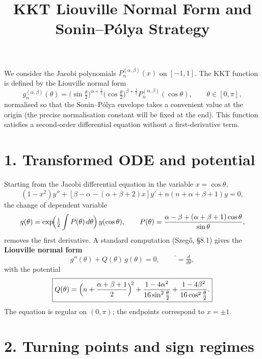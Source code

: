 \documentclass[11pt]{article}
\title{KKT Liouville Normal Form and Sonin--P\'olya Strategy}
\author{}
\date{}
\begin{document}
\maketitle
We consider the Jacobi polynomials \(P_n^{(\alpha,\beta)}(x)\) on \([-1,1]\). The KKT function is defined by the Liouville normal form
\begin{equation*}
g_n^{(\alpha,\beta)}(\theta)=\bigl(\sin\tfrac{\theta}{2}\bigr)^{\alpha+\frac12}
\bigl(\cos\tfrac{\theta}{2}\bigr)^{\beta+\frac12}
P_n^{(\alpha,\beta)}(\cos\theta),\qquad \theta\in[0,\pi],
\end{equation*}
normalised so that the Sonin–Pólya envelope takes a convenient value at the origin (the precise normalisation constant will be fixed at the end). This function satisfies a second‑order differential equation without a first‑derivative term.



\section*{1. Transformed ODE and potential}

Starting from the Jacobi differential equation in the variable \(x=\cos\theta\),
\begin{equation*}
(1-x^2)y''+[\beta-\alpha-(\alpha+\beta+2)x]y'+n(n+\alpha+\beta+1)y=0,
\end{equation*}
the change of dependent variable
\begin{equation*}
g(\theta)=
\exp\!\Bigl(\tfrac12\int P(\theta)\,d\theta\Bigr)\,y(\cos\theta),
\qquad
P(\theta)=\frac{\alpha-\beta+(\alpha+\beta+1)\cos\theta}{\sin\theta},
\end{equation*}
removes the first derivative.  A standard computation (Szegő, §8.1) gives the \textbf{Liouville normal form}
\begin{equation*}
\boxed{g''(\theta)+Q(\theta)\,g(\theta)=0,\qquad
{}^\prime=\tfrac{d}{d\theta},}
\end{equation*}
with the potential
\begin{equation*}
\boxed{
Q(\theta)=
\Bigl(n+\frac{\alpha+\beta+1}{2}\Bigr)^{\!2}
+\frac{1-4\alpha^2}{16\sin^2\frac{\theta}{2}}
+\frac{1-4\beta^2}{16\cos^2\frac{\theta}{2}}.
}
\end{equation*}
The equation is regular on \((0,\pi)\); the endpoints correspond to \(x=\pm1\).



\section*{2. Turning points and sign regimes}
\end{document}
